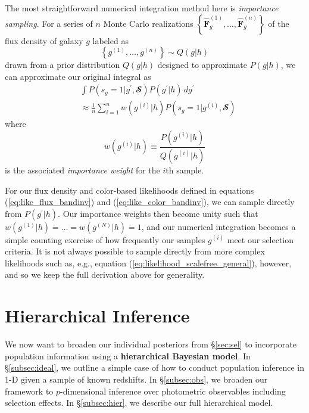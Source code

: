 \documentclass[a4paper,fleqn,usenatbib,english]{mnras}
\begin{document}
The most straightforward numerical integration method here is \textit{importance sampling}. For a series of $n$ Monte Carlo realizations $\left\lbrace \mathbf{\hat{F}}_g^{(1)},\ldots,\mathbf{\hat{F}}_g^{(n)} \right\rbrace$ of the flux density of galaxy $g$ labeled as
\begin{equation}
\left\lbrace g^{(1)},\ldots,g^{(n)} \right\rbrace \sim Q(g|h)
\end{equation}
drawn from a prior distribution $Q(g|h)$ designed to approximate $P(g|h)$, we can approximate our original integral as
\begin{align}
&\int P(s_g=1|g^\prime,\mathbfcal{S}) P(g^\prime|h) \, dg^\prime \nonumber \\ 
&\approx \frac{1}{n} \sum_{i=1}^n w(g^{(i)}|h) P(s_g=1|g^{(i)},\mathbfcal{S})
\end{align}
where 
\begin{equation}
w(g^{(i)}|h) \equiv \frac{P(g^{(i)}|h)}{Q(g^{(i)}|h)}
\end{equation}
is the associated \textit{importance weight} for the $i$th sample. 

For our flux density and color-based likelihoods defined in equations (\ref{eq:like_flux_bandinv}) and (\ref{eq:like_color_bandinv}), we can sample directly from $P(g^\prime|h)$. Our importance weights then become unity such that $w(g^{(1)}|h)=\ldots=w(g^{(N)}|h)=1$, and our numerical integration becomes a simple counting exercise of how frequently our samples $g^{(i)}$ meet our selection criteria. It is not always possible to sample directly from more complex likelihoods such as, e.g., equation (\ref{eq:likelihood_scalefree_general}), however, and so we keep the full derivation above for generality.


\section{Hierarchical Inference}
\label{sec:pop}

We now want to broaden our individual posteriors from \S\ref{sec:sel} to incorporate population information using a \textbf{hierarchical Bayesian model}. In \S\ref{subsec:ideal}, we outline a simple case of how to conduct population inference in 1-D given a sample of known redshifts. In \S\ref{subsec:obs}, we broaden our framework to $p$-dimensional inference over photometric observables including selection effects. In \S\ref{subsec:hier}, we describe our full hierarchical model.
\end{document}
